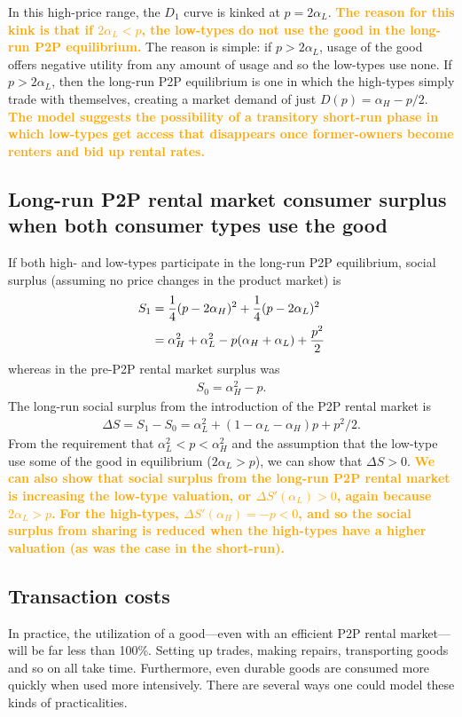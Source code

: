\documentclass[11pt]{article}
\newcommand{\important}[1]{\textcolor{orange}{\textbf{#1}}}
\newcommand{\important}[1]{#1}
\begin{document}
In this high-price range, the $D_1$ curve is kinked at $p = 2\alpha_L$. 
\important{The reason for this kink is that if $2\alpha_L < p$, the low-types do not use the good in the long-run P2P equilibrium.} 
The reason is simple: if $p > 2\alpha_L$, usage of the good offers negative utility from any amount of usage and so the low-types use none. 
If $p > 2 \alpha_L$, then the long-run P2P equilibrium is one in which the high-types simply trade with themselves, creating a market demand of just $D(p) = \alpha_H - p/2$. 
\important{The model suggests the possibility of a transitory short-run phase in which low-types get access that disappears once former-owners become renters and bid up rental rates.} 

\subsection{Long-run P2P rental market consumer surplus when both consumer types use the good} 
If both high- and low-types participate in the long-run P2P equilibrium, social surplus (assuming no price changes in the product market) is 
\begin{align} 
S_1 & = \frac{1}{4}(p - 2\alpha_H)^2 + \frac{1}{4}(p - 2\alpha_L)^2 \notag \\
    & = \alpha_H^2 + \alpha_L^2 - p(\alpha_H + \alpha_L) + \frac{p^2}{2} \notag \\ 
\end{align} 
whereas in the pre-P2P rental market surplus was 
\begin{align}
S_0 = \alpha_H^2 - p.  
\end{align} 
The long-run social surplus from the introduction of the P2P rental market is  
\begin{align}
\Delta S = S_1 - S_0 = \alpha_L^2 + (1 - \alpha_L - \alpha_H)p + p^2/2.  
\end{align} 
From the requirement that $\alpha_L^2 < p < \alpha_H^2$ and the assumption that the low-type use some of the good in equilibrium ($2 \alpha_L > p$), we can show that $\Delta S > 0$. 
\important{We can also show that social surplus from the long-run P2P rental market is increasing the low-type valuation, or $\Delta S'(\alpha_L) > 0$, again because $2\alpha_L > p$.}
\important{For the high-types, $\Delta S'(\alpha_H) = -p < 0$, and so the social surplus from sharing is 
reduced when the high-types have a higher valuation (as was the case in the short-run).}

\subsection{Transaction costs}
In practice, the utilization of a good---even with an efficient P2P rental market---will be far less than 100\%.
Setting up trades, making repairs, transporting goods and so on all take time.  
Furthermore, even durable goods are consumed more quickly when used more intensively. 
There are several ways one could model these kinds of practicalities. 
\end{document}
